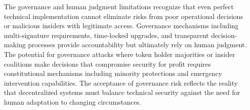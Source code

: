 The governance and human judgment limitations recognize that even perfect technical implementation cannot eliminate risks from poor operational decisions or malicious insiders with legitimate access. Governance mechanisms including multi-signature requirements, time-locked upgrades, and transparent decision-making processes provide accountability but ultimately rely on human judgment. The potential for governance attacks where token holder majorities or insider coalitions make decisions that compromise security for profit requires constitutional mechanisms including minority protections and emergency intervention capabilities. The acceptance of governance risk reflects the reality that decentralized systems must balance technical security against the need for human adaptation to changing circumstances.